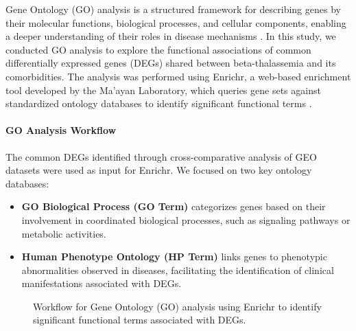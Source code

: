 Gene Ontology (GO) analysis is a structured framework for describing genes by their molecular functions, biological processes, and cellular components, enabling a deeper understanding of their roles in disease mechanisms \cite{b15}. In this study, we conducted GO analysis to explore the functional associations of common differentially expressed genes (DEGs) shared between beta-thalassemia and its comorbidities. The analysis was performed using Enrichr, a web-based enrichment tool developed by the Ma'ayan Laboratory, which queries gene sets against standardized ontology databases to identify significant functional terms \cite{b32}.

\paragraph{GO Analysis Workflow}

The common DEGs identified through cross-comparative analysis of GEO datasets were used as input for Enrichr. We focused on two key ontology databases:
\begin{itemize}
    \item \textbf{GO Biological Process (GO Term)} categorizes genes based on their involvement in coordinated biological processes, such as signaling pathways or metabolic activities.
    \item \textbf{Human Phenotype Ontology (HP Term)} links genes to phenotypic abnormalities observed in diseases, facilitating the identification of clinical manifestations associated with DEGs.
\end{itemize}

\begin{figure}[h]
\centering
{}
\caption{Workflow for Gene Ontology (GO) analysis using Enrichr to identify significant functional terms associated with DEGs.}
\label{fig:go_workflow}
\end{figure}

\vspace*{-\parskip} %
